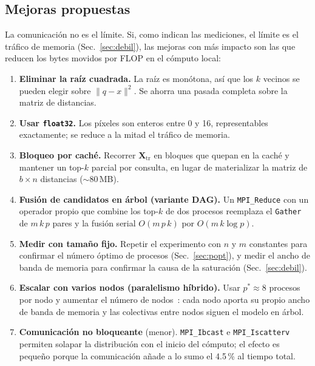 \documentclass[11pt,a4paper]{article}
\newcommand{\ntr}{n}   %
\newcommand{\mte}{m}   %
\newcommand{\Xtr}{\mathbf{X}_{\text{tr}}}
\begin{document}
\subsection{Mejoras propuestas}
\label{sec:mejoras}
La comunicación no es el límite. Si, como indican las mediciones, el límite es el tráfico de memoria
(Sec.~\ref{sec:debil}), las mejoras con más impacto son las que reducen los bytes movidos por FLOP en
el cómputo local:
\begin{enumerate}
  \item \textbf{Eliminar la raíz cuadrada.} La raíz es monótona, así que los $k$ vecinos se pueden
        elegir sobre $\|q-x\|^2$. Se ahorra una pasada completa sobre la matriz de distancias.
  \item \textbf{Usar \texttt{float32}.} Los píxeles son enteros entre 0 y 16, representables
        exactamente; se reduce a la mitad el tráfico de memoria.
  \item \textbf{Bloqueo por caché.} Recorrer $\Xtr$ en bloques que quepan en la caché y mantener un
        top-$k$ parcial por consulta, en lugar de materializar la matriz de $b\times\ntr$ distancias
        ($\sim$80\,MB).
  \item \textbf{Fusión de candidatos en árbol (variante DAG).} Un \texttt{MPI\_Reduce} con un operador
        propio que combine los top-$k$ de dos procesos reemplaza el \texttt{Gather} de $\mte\,k\,p$
        pares y la fusión serial $O(\mte\,p\,k)$ por $O(\mte\,k\log p)$.
  \item \textbf{Medir con tamaño fijo.} Repetir el experimento con $\ntr$ y $\mte$ constantes para
        confirmar el número óptimo de procesos (Sec.~\ref{sec:popt}), y medir el ancho de banda de
        memoria para confirmar la causa de la saturación (Sec.~\ref{sec:debil}).
  \item \textbf{Escalar con varios nodos (paralelismo híbrido).} Usar $p^*\approx8$ procesos por nodo
        y aumentar el número de nodos~\cite{fiestasU4}: cada nodo aporta su propio ancho de banda de
        memoria y las colectivas entre nodos siguen el modelo en árbol.
  \item \textbf{Comunicación no bloqueante} (menor). \texttt{MPI\_Ibcast} e
        \texttt{MPI\_Iscatterv}~\cite{fiestasU3} permiten solapar la distribución con el inicio del
        cómputo; el efecto es pequeño porque la comunicación añade a lo sumo el 4.5\,\% al tiempo
        total.
\end{enumerate}

\end{document}

